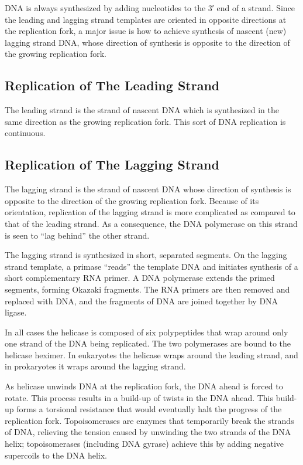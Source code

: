 DNA is always synthesized by adding nucleotides to the 3′ end of a strand. Since the leading and lagging strand templates are oriented in opposite directions at the replication fork, a major issue is how to achieve synthesis of nascent (new) lagging strand DNA, whose direction of synthesis is opposite to the direction of the growing replication fork.

\hypertarget{replication-of-the-leading-strand}{%
\subsection{Replication of The Leading Strand}\label{replication-of-the-leading-strand}}

The leading strand is the strand of nascent DNA which is synthesized in the same direction as the growing replication fork. This sort of DNA replication is continuous.

\hypertarget{replication-of-the-lagging-strand}{%
\subsection{Replication of The Lagging Strand}\label{replication-of-the-lagging-strand}}

The lagging strand is the strand of nascent DNA whose direction of synthesis is opposite to the direction of the growing replication fork. Because of its orientation, replication of the lagging strand is more complicated as compared to that of the leading strand. As a consequence, the DNA polymerase on this strand is seen to ``lag behind'' the other strand.

The lagging strand is synthesized in short, separated segments. On the lagging strand template, a primase ``reads'' the template DNA and initiates synthesis of a short complementary RNA primer. A DNA polymerase extends the primed segments, forming Okazaki fragments. The RNA primers are then removed and replaced with DNA, and the fragments of DNA are joined together by DNA ligase.

In all cases the helicase is composed of six polypeptides that wrap around only one strand of the DNA being replicated. The two polymerases are bound to the helicase heximer. In eukaryotes the helicase wraps around the leading strand, and in prokaryotes it wraps around the lagging strand.

As helicase unwinds DNA at the replication fork, the DNA ahead is forced to rotate. This process results in a build-up of twists in the DNA ahead. This build-up forms a torsional resistance that would eventually halt the progress of the replication fork. Topoisomerases are enzymes that temporarily break the strands of DNA, relieving the tension caused by unwinding the two strands of the DNA helix; topoisomerases (including DNA gyrase) achieve this by adding negative supercoils to the DNA helix.


